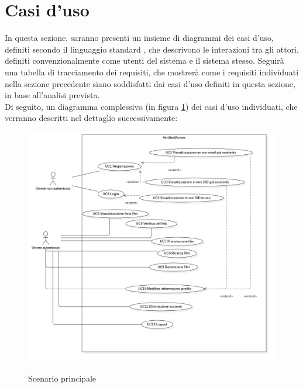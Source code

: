 \section{Casi d'uso}

In questa sezione, saranno presenti un insieme di diagrammi dei casi d'uso, definiti secondo il linguaggio standard ,
che descrivono le interazioni tra gli attori, definiti convenzionalmente come utenti del sistema e il sistema stesso. 
Seguirà una tabella di tracciamento dei requisiti, che mostrerà come i requisiti individuati nella sezione precedente siano soddisfatti
dai casi d'uso definiti in questa sezione, in base all'analisi prevista. \\

Di seguito, un diagramma complessivo (in figura \ref{fig:usecase-scenario-principale}) dei casi d'uso individuati, che verranno descritti nel dettaglio successivamente:

\begin{figure}[!h] 
    \centering 
    \includegraphics[width=0.9\columnwidth, alt={Scenario principale dei vari casi d'uso individuati}]{immagini/usecase/scenario-principale.jpg}
    \caption{Scenario principale}\label{fig:usecase-scenario-principale}
\end{figure}

